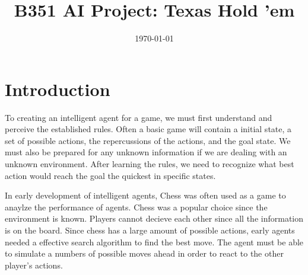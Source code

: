 \documentclass[10pt, a4paper, twocolumn]{article} %
\title{B351 AI Project: Texas Hold 'em} %
\author{
	\authorstyle{Steven Myers and Samuel Eleftheri} %
	\newline\newline %
	\institution{Indiana University, Bloomington, IN, USA} %
}
\date{\today} %
\begin{document}
\maketitle %

\thispagestyle{firstpage} %




\section{Introduction}

To creating an intelligent agent for a game, we must first understand and perceive the established rules. Often a basic game will contain a initial state, a set of possible actions, the repercussions of the actions, and the goal state. We must also be prepared for any unknown information if we are dealing with an unknown environment. After learning the rules, we need to recognize what best action would reach the goal the quickest in specific states.

In early development of intelligent agents, Chess was often used as a game to anaylze the performance of agents. Chess was a popular choice since the environment is known. Players cannot decieve each other since all the information is on the board. Since chess has a large amount of possible actions, early agents needed a effective search algorithm to find the best move. The agent must be able to simulate a numbers of possible moves ahead in order to react to the other player's actions.  
\end{document}
